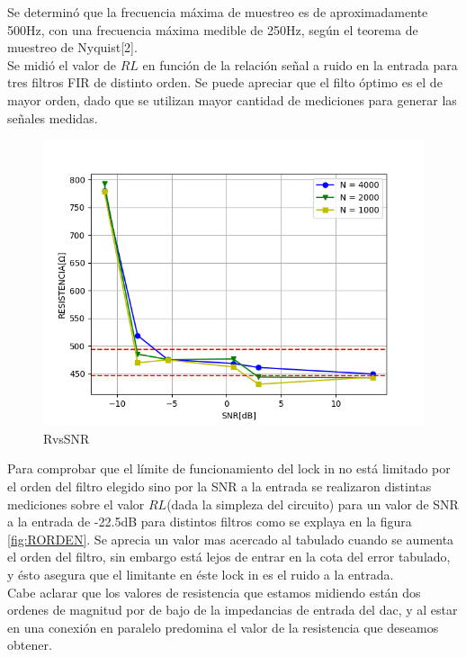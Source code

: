 \documentclass[11pt,a4paper]{extarticle}
\begin{document}
\begin{multicols}{2}
Se determinó que la frecuencia máxima de muestreo es 
de aproximadamente 
500Hz, con una frecuencia máxima medible de 250Hz, 
según el teorema de muestreo de Nyquist[2].\\

Se midió el valor de $RL$ en función 
de la relación señal a ruido en la entrada para tres 
filtros FIR de distinto orden.
Se puede apreciar que el filto óptimo es el de mayor 
orden, dado que se utilizan mayor cantidad de 
mediciones para generar las señales medidas.

\begin{figure}[H]
	\centering
	\includegraphics[width=\linewidth]{Images/RvsSNR(segunda).png}
	\caption{RvsSNR}
	\label{fig:RvsSNR}
\end{figure}

Para comprobar que el límite de funcionamiento 
del lock in no está limitado por el orden del 
filtro elegido sino por la SNR a la entrada
se realizaron distintas mediciones 
sobre el valor $RL$(dada la simpleza del circuito) 
para un valor de SNR a la entrada de -22.5dB para 
distintos filtros como se explaya en la figura 
\ref{fig:RORDEN}. Se aprecia un valor mas acercado 
al tabulado cuando se aumenta el orden del filtro, sin 
embargo está lejos de entrar en la cota del error 
tabulado, y ésto asegura que el limitante en éste 
lock in es el ruido a la entrada.\\

Cabe aclarar que los valores de resistencia que estamos
 midiendo están dos ordenes de magnitud por de 
 bajo de la impedancias de entrada del dac, y al estar en 
una conexión en paralelo predomina el valor de la resistencia 
que deseamos obtener.\\


\end{multicols}
\end{document}
